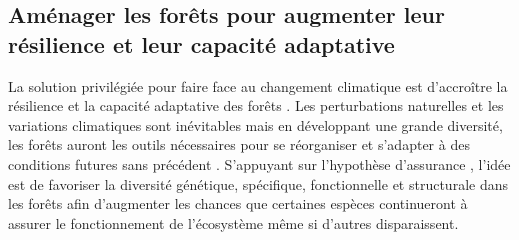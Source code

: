 \hypertarget{amuxe9nager-les-foruxeats-pour-augmenter-leur-ruxe9silience-et-leur-capacituxe9-adaptative}{%
\subsection{Aménager les forêts pour augmenter leur résilience et leur
capacité
adaptative}\label{amuxe9nager-les-foruxeats-pour-augmenter-leur-ruxe9silience-et-leur-capacituxe9-adaptative}}

La solution privilégiée pour faire face au changement climatique est
d'accroître la résilience et la capacité adaptative des forêts
\citep{messier_managing_2013, seastedt_management_2008}. Les
perturbations naturelles et les variations climatiques sont inévitables
mais en développant une grande diversité, les forêts auront les outils
nécessaires pour se réorganiser et s'adapter à des conditions futures
sans précédent \citep{messier_dealing_2016}. S'appuyant sur l'hypothèse
d'assurance \citep[de l'anglais \emph{insurance
hypothesis};][]{yachi_biodiversity_1999}, l'idée est de favoriser la
diversité génétique, spécifique, fonctionnelle et structurale dans les
forêts afin d'augmenter les chances que certaines espèces continueront à
assurer le fonctionnement de l'écosystème même si d'autres
disparaissent.

